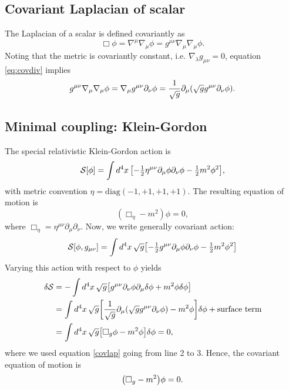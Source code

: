 \documentclass{article}
\begin{document}
\subsection{Covariant Laplacian of scalar}
The Laplacian of a scalar is defined covariantly as
\begin{equation}
	\Box \phi = \nabla^{\mu} \nabla_{\mu} \phi = g^{\mu \nu} \nabla_{\mu} \nabla_{\mu} \phi.
\end{equation}
Noting that the metric is covariantly constant, i.e. $ \nabla_{\lambda} g_{\mu\nu} = 0 $, equation \eqref{eq:covdiv} implies
\begin{equation} \label{covlap}
	g^{\mu \nu} \nabla_{\mu} \nabla_{\mu} \phi = \nabla_{\mu} g^{\mu\nu} \partial_{\nu} \phi = \frac{1}{\sqrt{g}} \partial_{\mu} \qty(\sqrt{g} g^{\mu\nu} \partial_{\nu} \phi).
\end{equation}
\subsection{Minimal coupling: Klein-Gordon}
The special relativistic Klein-Gordon action is
\begin{equation}
	\mathcal{S}[\phi] = \int \dd[4]{x} \qty[-\tfrac{1}{2}\eta^{\mu\nu} \partial_{\mu}\phi \partial_{\nu} \phi - \tfrac{1}{2} m^{2} \phi^{2}],
\end{equation}
with metric convention $ \eta = \text{diag}(-1,+1,+1,+1) $. The resulting equation of motion is
\begin{equation}
	(\Box_{\eta} - m^{2}) \phi = 0,
\end{equation}
where $ \Box_{\eta} = \eta^{\mu\nu}\partial_{\mu}\partial_{\nu} $. Now, we write generally covariant action:
\begin{equation}
	\mathcal{S}[\phi, g_{\mu\nu}] = \int \dd[4]{x} \sqrt{g} \qty[-\tfrac{1}{2} g^{\mu\nu}\partial_{\mu}\phi \partial_{\nu}\phi - \tfrac{1}{2} m^{2} \phi^{2}]
\end{equation}
Varying this action with respect to $ \phi $ yields
\begin{align}
	\begin{split}
		\delta \mathcal{S} &= -\int \dd[4]{x} \sqrt{g} \qty[ g^{\mu\nu} \partial_{\nu} \phi \partial_{\mu} \delta \phi + m^{2} \phi \delta \phi] \\
		&= \int \dd[4]{x} \sqrt{g} \qty[ \frac{1}{\sqrt{g}} \partial_{\mu} \qty( \sqrt{g} g^{\mu \nu} \partial_{\nu} \phi ) - m^{2} \phi ] \delta \phi + \text{surface term} \\
		&= \int \dd[4]{x} \sqrt{g} \qty[\Box_{g} \phi - m^{2} \phi] \delta \phi = 0,
	\end{split}
\end{align}
where we used equation \eqref{covlap} going from line 2 to 3. Hence, the covariant equation of motion is
\begin{equation}
	\qty(\Box_{g} - m^{2}) \phi = 0.
\end{equation}
\end{document}

